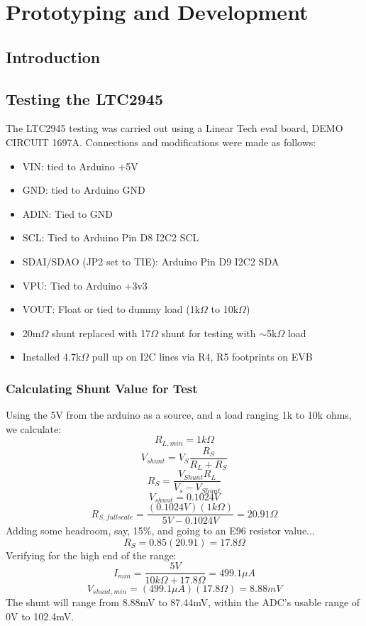 \chapter{Prototyping and Development}
\label{chap:prototyping-dev}

\section{Introduction}


\section{Testing the LTC2945}
    The LTC2945 testing was carried out using a Linear Tech eval board, DEMO CIRCUIT 1697A. Connections and modifications were made as follows:
    \begin{itemize}
        \item VIN: tied to Arduino +5V
        \item GND: tied to Arduino GND
        \item ADIN: Tied to GND
        \item SCL: Tied to Arduino Pin D8 I2C2 SCL
        \item SDAI/SDAO (JP2 set to TIE): Arduino Pin D9 I2C2 SDA
        \item VPU: Tied to Arduino +3v3
        \item VOUT: Float or tied to dummy load (1k$\Omega$ to 10k$\Omega$)
        \item 20m$\Omega$ shunt replaced with 17$\Omega$ shunt for testing with $\sim$5k$\Omega$ load
        \item Installed 4.7k$\Omega$ pull up on I2C lines via R4, R5 footprints on EVB
    \end{itemize}

    \newpage
    \subsection{Calculating Shunt Value for Test}
    Using the 5V from the arduino as a source, and a load ranging 1k to 10k ohms, we calculate:
    $$R_{L,min}=1k\Omega$$
    $$V_{shunt}=V_S\frac{R_S}{R_L+R_S}$$
    $$R_S=\frac{V_{Shunt}R_L}{V_s-V_{Shunt}}$$
    $$V_{shunt}=0.1024V$$
    $$R_{S,full scale}=\frac{(0.1024V)(1k\Omega)}{5V-0.1024V}=20.91\Omega$$
    Adding some headroom, say, 15\%, and going to an E96 resistor value...
    $$R_S=0.85(20.91)=17.8\Omega$$
    Verifying for the high end of the range:
    $$I_{min}=\frac{5V}{10k\Omega + 17.8\Omega}=499.1\mu A$$
    $$V_{shunt, min}=(499.1\mu A)(17.8\Omega)=8.88mV$$
    The shunt will range from 8.88mV to 87.44mV, within the ADC's usable range of 0V to 102.4mV.

